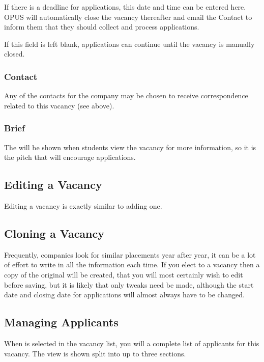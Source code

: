 \documentclass[12 pt]{book}
\begin{document}
If there is a deadline for applications, this date and time can be entered 
here. OPUS will automatically close the vacancy thereafter and email the
Contact to inform them that they should collect and process applications.

If this field is left blank, applications can continue until the vacancy is
manually closed.

\subsubsection{Contact}

Any of the contacts for the company may be chosen to receive correspondence
related to this vacancy (see above).

\subsubsection{Brief}

The  will be shown when students view the vacancy for more
information, so it is the pitch that will encourage applications.

\subsection{Editing a Vacancy}

Editing a vacancy is exactly similar to adding one.

\subsection{Cloning a Vacancy}

Frequently, companies look for similar placements year after year, it can be
a lot of effort to write in all the information each time. If you elect to
 a vacancy then a copy of the original will be created, that
you will most certainly wish to edit before saving, but it is likely that
only tweaks need be made, although the start date and closing date for 
applications will almost always have to be changed.

\subsection{Managing Applicants}

When  is selected in the vacancy list, you will a 
complete list of applicants for this vacancy. The view is shown split into
up to three sections.
\end{document}
